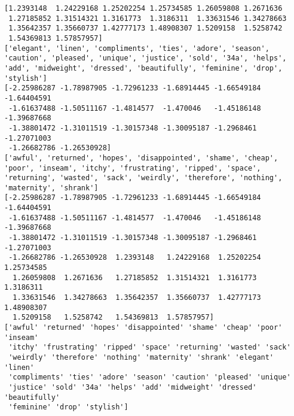 \documentclass[11pt]{article}
\begin{document}
    \begin{Verbatim}[commandchars=\\\{\}]
[1.2393148  1.24229168 1.25202254 1.25734585 1.26059808 1.2671636
 1.27185852 1.31514321 1.3161773  1.3186311  1.33631546 1.34278663
 1.35642357 1.35660737 1.42777173 1.48908307 1.5209158  1.5258742
 1.54369813 1.57857957]
['elegant', 'linen', 'compliments', 'ties', 'adore', 'season', 'caution', 'pleased', 'unique', 'justice', 'sold', '34a', 'helps', 'add', 'midweight', 'dressed', 'beautifully', 'feminine', 'drop', 'stylish']
[-2.25986287 -1.78987905 -1.72961233 -1.68914445 -1.66549184 -1.64404591
 -1.61637488 -1.50511167 -1.4814577  -1.470046   -1.45186148 -1.39687668
 -1.38801472 -1.31011519 -1.30157348 -1.30095187 -1.2968461  -1.27071003
 -1.26682786 -1.26530928]
['awful', 'returned', 'hopes', 'disappointed', 'shame', 'cheap', 'poor', 'inseam', 'itchy', 'frustrating', 'ripped', 'space', 'returning', 'wasted', 'sack', 'weirdly', 'therefore', 'nothing', 'maternity', 'shrank']
[-2.25986287 -1.78987905 -1.72961233 -1.68914445 -1.66549184 -1.64404591
 -1.61637488 -1.50511167 -1.4814577  -1.470046   -1.45186148 -1.39687668
 -1.38801472 -1.31011519 -1.30157348 -1.30095187 -1.2968461  -1.27071003
 -1.26682786 -1.26530928  1.2393148   1.24229168  1.25202254  1.25734585
  1.26059808  1.2671636   1.27185852  1.31514321  1.3161773   1.3186311
  1.33631546  1.34278663  1.35642357  1.35660737  1.42777173  1.48908307
  1.5209158   1.5258742   1.54369813  1.57857957]
['awful' 'returned' 'hopes' 'disappointed' 'shame' 'cheap' 'poor' 'inseam'
 'itchy' 'frustrating' 'ripped' 'space' 'returning' 'wasted' 'sack'
 'weirdly' 'therefore' 'nothing' 'maternity' 'shrank' 'elegant' 'linen'
 'compliments' 'ties' 'adore' 'season' 'caution' 'pleased' 'unique'
 'justice' 'sold' '34a' 'helps' 'add' 'midweight' 'dressed' 'beautifully'
 'feminine' 'drop' 'stylish']

    \end{Verbatim}

    \begin{center}
    \end{center}
    { \hspace*{\fill} \\}
    
\end{document}
